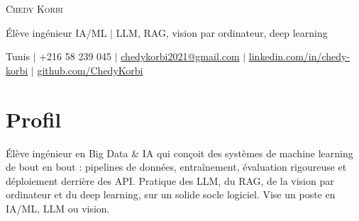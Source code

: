 \documentclass[a4paper,11pt]{article}
\begin{document}
\begin{center}
  {\Huge\scshape Chedy Korbi}\par\vspace{5pt}
  Élève ingénieur IA/ML $|$ LLM, RAG, vision par ordinateur, deep learning\par\vspace{2pt}
  \small Tunis $|$ +216 58 239 045 $|$
  \href{mailto:chedykorbi2021@gmail.com}{chedykorbi2021@gmail.com} $|$
  \href{https://www.linkedin.com/in/chedy-korbi-2463a9250/}{linkedin.com/in/chedy-korbi} $|$
  \href{https://github.com/ChedyKorbi}{github.com/ChedyKorbi}
\end{center}

\section{Profil}
\small Élève ingénieur en Big Data \& IA qui conçoit des systèmes de machine learning de bout en bout : pipelines de données,
entraînement, évaluation rigoureuse et déploiement derrière des API. Pratique des LLM, du RAG, de la vision par ordinateur et
du deep learning, sur un solide socle logiciel. Vise un poste en IA/ML, LLM ou vision.\normalsize
\end{document}
